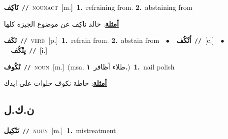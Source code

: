 \documentclass[10pt,a4paper,twoside]{article} %
\begin{document}
\begin{multicols}{2}
{\setlength\topsep{0pt}\textbf{\foreignlanguage{arabic}{نَاكِف}}\ {\color{gray}\texttt{//}\color{black}}\ \textsc{noun\textunderscore act}\ [m.]\ \textbf{1.}~refraining from.  \textbf{2.}~abstaining from\  \begin{flushright}\color{gray}\foreignlanguage{arabic}{\textbf{\underline{\foreignlanguage{arabic}{أمثلة}}}: خالد ناكِف عن موضوع الجيزة كلها}\end{flushright}\color{black}} \vspace{2mm}

{\setlength\topsep{0pt}\textbf{\foreignlanguage{arabic}{نَكَف}}\ {\color{gray}\texttt{//}\color{black}}\ \textsc{verb}\ [p.]\ \textbf{1.}~refrain from.  \textbf{2.}~abstain from\ \ $\bullet$\ \ \setlength\topsep{0pt}\textbf{\foreignlanguage{arabic}{اُنْكُف}}\ {\color{gray}\texttt{//}\color{black}}\ [c.]\ \ $\bullet$\ \ \setlength\topsep{0pt}\textbf{\foreignlanguage{arabic}{يِنْكُف}}\ {\color{gray}\texttt{//}\color{black}}\ [i.]\ } \vspace{2mm}

{\setlength\topsep{0pt}\textbf{\foreignlanguage{arabic}{نْكُوف}}\ {\color{gray}\texttt{//}\color{black}}\ \textsc{noun}\ [m.]\ \color{gray}(msa. \foreignlanguage{arabic}{طلاء أظافر}~\foreignlanguage{arabic}{\textbf{١.}})\color{black}\ \textbf{1.}~nail polish\  \begin{flushright}\color{gray}\foreignlanguage{arabic}{\textbf{\underline{\foreignlanguage{arabic}{أمثلة}}}: حاطة نكوف حلوات على ايدك}\end{flushright}\color{black}} \vspace{2mm}

\vspace{-3mm}
\subsection*{\color{blue}\foreignlanguage{arabic}{ن.ك.ل}\color{blue}{}} 

{\setlength\topsep{0pt}\textbf{\foreignlanguage{arabic}{تَنْكِيل}}\ {\color{gray}\texttt{//}\color{black}}\ \textsc{noun}\ [m.]\ \textbf{1.}~mistreatment\ } \vspace{2mm}


\end{multicols}
\end{document}
